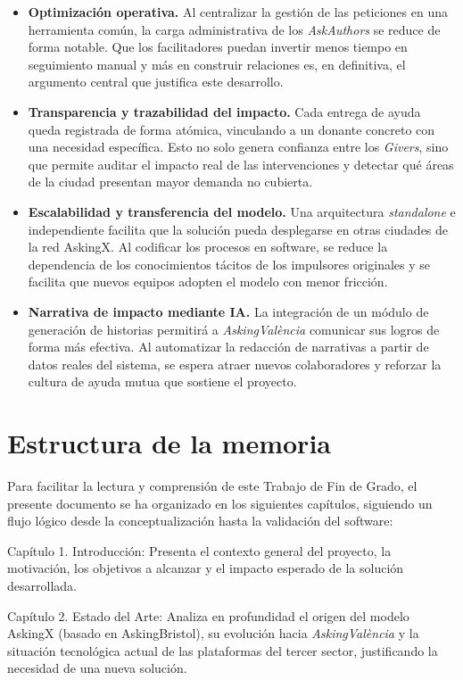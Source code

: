 \documentclass[11pt,oneside,spanish,listoffigures,listoftables]{tfgetsinf}
\begin{document}
\begin{itemize}
    \item \textbf{Optimización operativa.} Al centralizar la gestión de las peticiones en una herramienta común, la carga administrativa de los \textit{AskAuthors} se reduce de forma notable. Que los facilitadores puedan invertir menos tiempo en seguimiento manual y más en construir relaciones es, en definitiva, el argumento central que justifica este desarrollo.

    \item \textbf{Transparencia y trazabilidad del impacto.} Cada entrega de ayuda queda registrada de forma atómica, vinculando a un donante concreto con una necesidad específica. Esto no solo genera confianza entre los \textit{Givers}, sino que permite auditar el impacto real de las intervenciones y detectar qué áreas de la ciudad presentan mayor demanda no cubierta.

    \item \textbf{Escalabilidad y transferencia del modelo.} Una arquitectura \textit{standalone} e independiente facilita que la solución pueda desplegarse en otras ciudades de la red AskingX. Al codificar los procesos en software, se reduce la dependencia de los conocimientos tácitos de los impulsores originales y se facilita que nuevos equipos adopten el modelo con menor fricción.

    \item \textbf{Narrativa de impacto mediante IA.} La integración de un módulo de generación de historias permitirá a \textit{AskingValència} comunicar sus logros de forma más efectiva. Al automatizar la redacción de narrativas a partir de datos reales del sistema, se espera atraer nuevos colaboradores y reforzar la cultura de ayuda mutua que sostiene el proyecto.
\end{itemize}

\section{Estructura de la memoria}
Para facilitar la lectura y comprensión de este Trabajo de Fin de Grado, el presente documento se ha organizado en los siguientes capítulos, siguiendo un flujo lógico desde la conceptualización hasta la validación del software:

Capítulo 1. Introducción: Presenta el contexto general del proyecto, la motivación, los objetivos a alcanzar y el impacto esperado de la solución desarrollada.

Capítulo 2. Estado del Arte: Analiza en profundidad el origen del modelo AskingX (basado en AskingBristol), su evolución hacia \textit{AskingValència} y la situación tecnológica actual de las plataformas del tercer sector, justificando la necesidad de una nueva solución.
\end{document}
